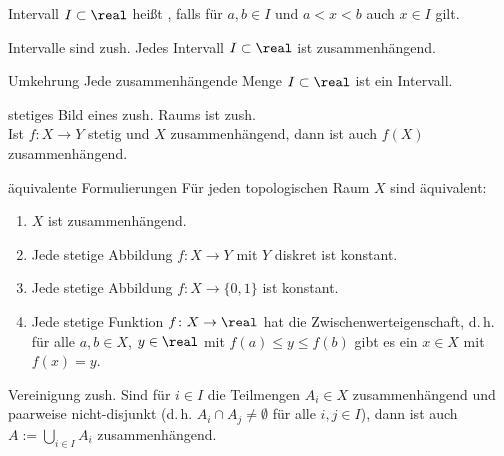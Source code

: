 \begin{Def}{Intervall}
    $I \subset \real$ heißt , falls
    für $a, b \in I$ und $a < x < b$ auch $x \in I$ gilt.
\end{Def}

\begin{Satz}{Intervalle sind zush.}
    Jedes Intervall $I \subset \real$ ist zusammenhängend.
\end{Satz}

\begin{Satz}{Umkehrung}
    Jede zusammenhängende Menge $I \subset \real$ ist ein Intervall.
\end{Satz}

\linie

\begin{Satz}{stetiges Bild eines zush. Raums ist zush.}\\
    Ist $f\colon X \rightarrow Y$ stetig und $X$ zusammenhängend,
    dann ist auch $f(X)$ zusammenhängend.
\end{Satz}

\begin{Satz}{äquivalente Formulierungen}
    Für jeden topologischen Raum $X$ sind äquivalent:
    \begin{enumerate}
        \item
        $X$ ist zusammenhängend.
        
        \item
        Jede stetige Abbildung $f\colon X \rightarrow Y$ mit $Y$ diskret
        ist konstant.
        
        \item
        Jede stetige Abbildung $f\colon X \rightarrow \{0, 1\}$
        ist konstant.
        
        \item
        Jede stetige Funktion $f\colon X \rightarrow \real$ hat die
        Zwischenwerteigenschaft, d.\,h.
        für alle $a, b \in X$, $y \in \real$ mit $f(a) \le y \le f(b)$ gibt
        es ein $x \in X$ mit $f(x) = y$.
    \end{enumerate}
\end{Satz}

\linie

\begin{Lemma}{Vereinigung zush.}
    Sind für $i \in I$ die Teilmengen $A_i \in X$ zusammenhängend und
    paarweise nicht-disjunkt
    (d.\,h. $A_i \cap A_j \not= \emptyset$ für alle $i, j \in I$),
    dann ist auch $A := \bigcup_{i \in I} A_i$ zusammenhängend.
\end{Lemma}


